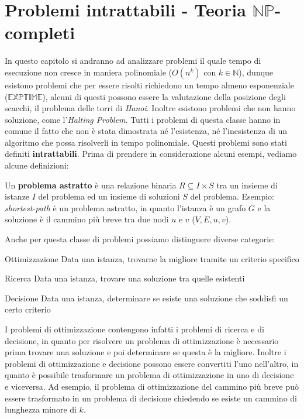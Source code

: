 \chapter{\texorpdfstring{Problemi intrattabili - Teoria $\mathbb{NP}$-completi}{Problemi intrattabili - Teoria NP-completi}}
\thispagestyle{chapterInit}

In questo capitolo si andranno ad analizzare problemi il quale tempo di esecuzione non cresce in maniera polinomiale ($O(n^k)$ con $k\in\mathbb{N}$), dunque esistono problemi che per essere risolti richiedono un tempo almeno esponenziale ($\mathbb{EXPTIME}$), alcuni di questi possono essere la valutazione della posizione degli scacchi, il problema delle torri di \textit{Hanoi}. Inoltre esistono problemi che non hanno soluzione, come l'\textit{Halting Problem}.\newline
Tutti i problemi di questa classe hanno in comune il fatto che non è stata dimostrata né l'esistenza, né l'inesistenza di un algoritmo che possa risolverli in tempo polinomiale. Questi problemi sono stati definiti \textbf{intrattabili}.\newline
Prima di prendere in considerazione alcuni esempi, vediamo alcune definizioni:
\begin{definition}
    Un \textbf{problema astratto} è una relazione binaria $R\subseteq I\times S$ tra un insieme di istanze $I$ del problema ed un insieme di soluzioni $S$ del problema.\newline
    Esempio: \textit{shortest-path} è un problema astratto, in quanto l'istanza è un grafo $G$ e la soluzione è il cammino più breve tra due nodi $u$ e $v$ ($V,E,u,v$).
\end{definition}
Anche per questa classe di problemi possiamo distinguere diverse categorie:
\begin{definition}
    \item[Ottimizzazione] Data una istanza, trovarne la migliore tramite un criterio specifico
    \item[Ricerca] Data una istanza, trovare una soluzione tra quelle esistenti
    \item[Decisione] Data una istanza, determinare se esiste una soluzione che soddisfi un certo criterio
\end{definition}
I problemi di ottimizzazione contengono infatti i problemi di ricerca e di decisione, in quanto per risolvere un problema di ottimizzazione è necessario prima trovare una soluzione e poi determinare se questa è la migliore. Inoltre i problemi di ottimizzazione e decisione possono essere convertiti l'uno nell'altro, in quanto è possibile trasformare un problema di ottimizzazione in uno di decisione e viceversa. Ad esempio, il problema di ottimizzazione del cammino più breve può essere trasformato in un problema di decisione chiedendo se esiste un cammino di lunghezza minore di $k$.
